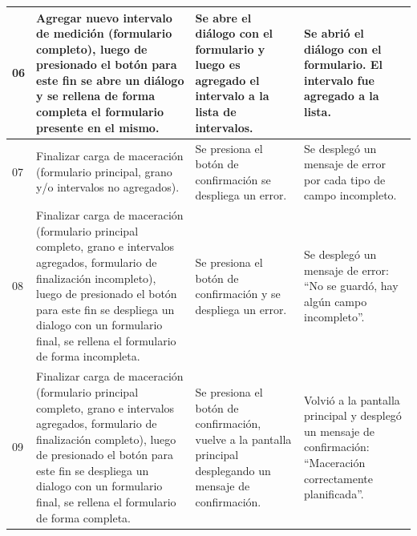 \begin{longtable}{|p{0.6cm}|p{4cm}|p{4.7cm}|p{4.7cm}|}
    \hline
    06 & Agregar nuevo intervalo de medición (formulario completo), luego de presionado el botón para este fin se abre un diálogo y se rellena de forma completa el formulario presente en el mismo. & Se abre el diálogo con el formulario y luego es agregado el intervalo a la lista de intervalos. & Se abrió el diálogo con el formulario. El intervalo fue agregado a la lista.\\
    \hline
    07 & Finalizar carga de maceración (formulario principal, grano y/o intervalos no agregados). & Se presiona el botón de confirmación se despliega un error. & Se desplegó un mensaje de error por cada tipo de campo incompleto.\\
    \hline
    08 & Finalizar carga de maceración (formulario principal completo, grano e intervalos agregados, formulario de finalización incompleto), luego de presionado el botón para este fin se despliega un dialogo con un formulario final, se rellena el formulario de forma incompleta. & Se presiona el botón de confirmación y se despliega un error. & Se desplegó un mensaje de error: ``No se guardó, hay algún campo incompleto''.\\
    \hline
    09 & Finalizar carga de maceración (formulario principal completo, grano e intervalos agregados, formulario de finalización completo), luego de presionado el botón para este fin se despliega un dialogo con un formulario final, se rellena el formulario de forma completa. & Se presiona el botón de confirmación, vuelve a la pantalla principal desplegando un mensaje de confirmación. & Volvió a la pantalla principal y desplegó un mensaje de confirmación: ``Maceración correctamente planificada''.\\
    \hline

 \end{longtable}



